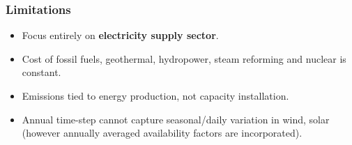 \begin{frame}
  \frametitle{Limitations}
        \begin{itemize}
        
         \item Focus entirely on \textbf{electricity supply sector}.      
         
         \item Cost of fossil fuels, geothermal, hydropower, steam reforming and nuclear is constant.
         
         \item Emissions tied to energy production, not capacity installation.
         
         \item Annual time-step cannot capture seasonal/daily variation in wind, solar (however annually averaged availability factors are incorporated).
        
        \end{itemize}

\end{frame}
